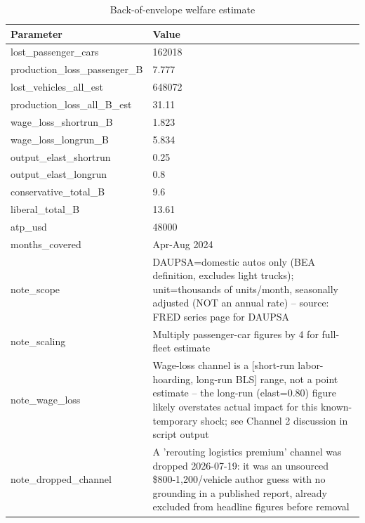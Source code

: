 \begin{table}
\caption{Back-of-envelope welfare estimate}
\label{tab:table5_welfare_estimate}
\begin{tabular}{ll}
\toprule
Parameter & Value \\
\midrule
lost\_passenger\_cars & 162018 \\
production\_loss\_passenger\_B & 7.777 \\
lost\_vehicles\_all\_est & 648072 \\
production\_loss\_all\_B\_est & 31.11 \\
wage\_loss\_shortrun\_B & 1.823 \\
wage\_loss\_longrun\_B & 5.834 \\
output\_elast\_shortrun & 0.25 \\
output\_elast\_longrun & 0.8 \\
conservative\_total\_B & 9.6 \\
liberal\_total\_B & 13.61 \\
atp\_usd & 48000 \\
months\_covered & Apr-Aug 2024 \\
note\_scope & DAUPSA=domestic autos only (BEA definition, excludes light trucks); unit=thousands of units/month, seasonally adjusted (NOT an annual rate) -- source: FRED series page for DAUPSA \\
note\_scaling & Multiply passenger-car figures by 4 for full-fleet estimate \\
note\_wage\_loss & Wage-loss channel is a [short-run labor-hoarding, long-run BLS] range, not a point estimate -- the long-run (elast=0.80) figure likely overstates actual impact for this known-temporary shock; see Channel 2 discussion in script output \\
note\_dropped\_channel & A 'rerouting logistics premium' channel was dropped 2026-07-19: it was an unsourced \$800-1,200/vehicle author guess with no grounding in a published report, already excluded from headline figures before removal \\
\bottomrule
\end{tabular}
\end{table}
